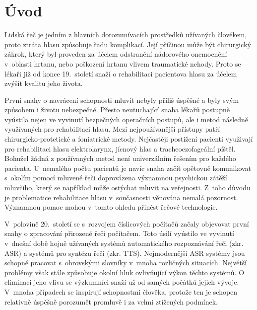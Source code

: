 \chapter*{Úvod}
\label{chap:introduction}

Lidská řeč je jedním z hlavních dorozumívacích prostředků užívaných člověkem, proto
ztráta hlasu způsobuje řadu komplikací. Její příčinou může být chirurgický zákrok, který byl proveden za účelem odstranění nádorového onemocnění v~oblasti hrtanu, nebo
poškození hrtanu vlivem traumatické nehody. Proto se lékaři již od konce 19.~století snaží o rehabilitaci pacientova hlasu za účelem zvýšit kvalitu jeho života.

První snahy o navrácení schopnosti mluvit nebyly příliš úspěšné a byly svým
způsobem i životu nebezpečné. Přesto neutuchající snaha lékařů postupně
vyústila nejen ve vyvinutí bezpečných operačních postupů, ale i metod následně využívaných pro rehabilitaci hlasu. Mezi nejpoužívanější přístupy patří chirurgicko-protetické a foniatrické metody.
Nejčastěji postižení pacienti využivají pro rehabilitaci hlasu elektrolarynx, jícnový hlas a tracheoezofageální píštěl. Bohužel žádná z používaných metod není univerzálním řešením pro každého pacienta.
U~nemalého počtu pacientů je navíc snaha začít opětovně komunikovat s~okolím pomocí mluvené řeči doprovázena významnou psychickou zátěží mluvčího, který se například může ostýchat mluvit na veřejnosti.
Z~toho důvodu je problematice rehabilitace hlasu v~současnosti věnována nemalá pozornost. Významnou pomoc mohou v~tomto ohledu přinést řečové technologie.

V~polovině 20.~století se s~rozvojem číslicových počítačů začaly objevovat první
snahy o zpracování přirozené řeči počítačem. Toto úsilí vyústilo ve vyvinutí v~dnešní
době hojně užívaných systémů automatického rozpoznávání řeči (zkr. ASR) a systémů pro syntézu
řeči (zkr. TTS). Nejmodernější ASR systémy jsou schopné pracovat s~obrovskými
slovníky v~mnoha rozličných situacích. Největší problémy však stále způsobuje
okolní hluk ovlivňující výkon těchto systémů. O eliminaci jeho vlivu se
výzkumníci snaží už od samých počátků jejich vývoje. V~mnoha případech se
inspirují schopnostmi člověka, protože ten je schopen relativně úspěšně
porozumět promluvě i za velmi ztížených podmínek.


